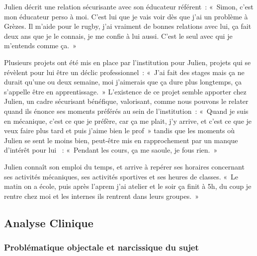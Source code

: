 \documentclass[12pt, a4paper]{book}
\begin{document}
\begin{spacing}{1.5}
Julien décrit une relation sécurisante avec son éducateur référent : « Simon, c'est mon éducateur perso à moi. C'est lui que je vais voir dès que j'ai un problème à Grèzes. Il m'aide pour le rugby, j'ai vraiment de bonnes relations avec lui, ça fait deux ans que je le connais, je me confie à lui aussi. C'est le seul avec qui je m'entends comme ça. »

Plusieurs projets ont été mis en place par l'institution pour Julien, projets qui se révèlent pour lui être un déclic professionnel : « J'ai fait des stages mais ça ne durait qu'une ou deux semaine, moi j'aimerais que ça dure plus longtemps, ça s'appelle être en apprentissage. » L'existence de ce projet semble apporter chez Julien, un cadre sécurisant bénéfique, valorisant,  comme nous pouvons le relater quand ils énonce ses moments préférés au sein de l'institution : « Quand je suis en mécanique, c'est ce que je préfère, car ça me plait, j'y arrive, et c'est ce que je veux faire plus tard et puis j'aime bien le prof » tandis que les moments où Julien se sent le moins bien, peut-être mis en rapprochement par un manque d'intérêt pour lui  : « Pendant les cours, ça me saoule, je fous rien. »

Julien connaît son emploi du temps, et arrive à repérer ses horaires concernant ses activités mécaniques, ses activités sportives et ses heures de classes. « Le matin on a école, puis après l'aprem j'ai atelier et le soir ça finit à 5h, du coup je rentre chez moi et les internes ils rentrent dans leurs groupes. »

\subsection{Analyse Clinique}

\subsubsection{Problématique objectale et narcissique du sujet}


\end{spacing}
\end{document}

